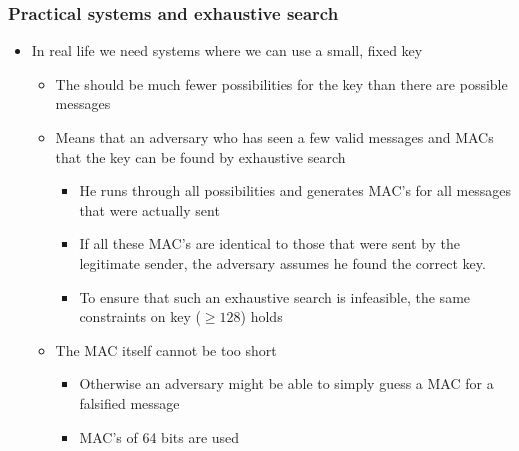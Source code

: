 \documentclass[11pt]{article}
\begin{document}
\subsubsection{Practical systems and exhaustive search}
\label{sec:org0f04d9f}
\begin{itemize}
\item In real life we need systems where we can use a small, fixed key
\begin{itemize}
\item The should be much fewer possibilities for the key than there are possible messages
\item Means that an adversary who has seen a few valid messages and MACs that the key can be found by exhaustive search
\begin{itemize}
\item He runs through all possibilities and generates MAC's for all messages that were actually sent
\item If all these MAC’s are identical to those that were sent by the legitimate sender, the adversary assumes he found the correct key.
\item To ensure that such an exhaustive search is infeasible, the same constraints on key (\(\geq 128\)) holds
\end{itemize}
\item The MAC itself cannot be too short
\begin{itemize}
\item Otherwise an adversary might be able to simply guess a MAC for a falsified message
\item MAC's of 64 bits are used
\end{itemize}
\end{itemize}
\end{itemize}
\end{document}
